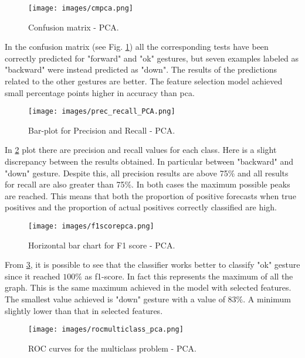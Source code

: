 \begin{figure}[h]
	\centering
	\texttt{[image: images/cmpca.png]}
	\caption[Confusion matrix - PCA.]{Confusion matrix - PCA.}
	\label{fig:confpca}
\end{figure}

\noindent In the confusion matrix (see Fig. \ref{fig:confpca}) all the corresponding tests have been correctly predicted for "forward" and "ok" gestures, but seven examples labeled as "backward" were instead predicted as "down". The results of the predictions related to the other gestures are better. The feature selection model achieved small percentage points higher in accuracy than \gls{pca}. \\

\begin{figure}[H]
	\centering
	\texttt{[image: images/prec\_recall\_PCA.png]}
	\caption[Bar-plot for Precision and Recall - PCA.]{Bar-plot for Precision and Recall - PCA.}
	\label{fig:precrecpca}
\end{figure}

\noindent In \ref{fig:precrecpca} plot there are precision and recall values for each class. Here is a slight discrepancy between the results obtained. In particular between "backward" and "down" gesture. Despite this, all precision results are above 75\% and all results for recall are also greater than 75\%. In both cases the maximum possible peaks are reached. This means that both the proportion of positive forecasts when true positives and the proportion of actual positives correctly classified are high. \\

\begin{figure}[h]
	\centering
	\texttt{[image: images/f1scorepca.png]}
	\caption[Horizontal bar chart for F1 score - PCA.]{Horizontal bar chart for F1 score - PCA.}
	\label{fig:f1pca}
\end{figure}

\noindent From \ref{fig:f1pca}, it is possible to see that the classifier works better to classify "ok" gesture since it reached $100\%$ as f1-score. In fact this represents the maximum of all the graph. This is the same maximum achieved in the model with selected features. The smallest value achieved is "down" gesture with a value of $83\%$. A minimum slightly lower than that in selected features.\\

\begin{figure}[H]
	\centering
	\texttt{[image: images/rocmulticlass\_pca.png]}
	\caption[ROC curves for the multiclass problem - PCA.]{ROC curves for the multiclass problem - PCA.}
	\label{fig:roccurvespca}
\end{figure}


